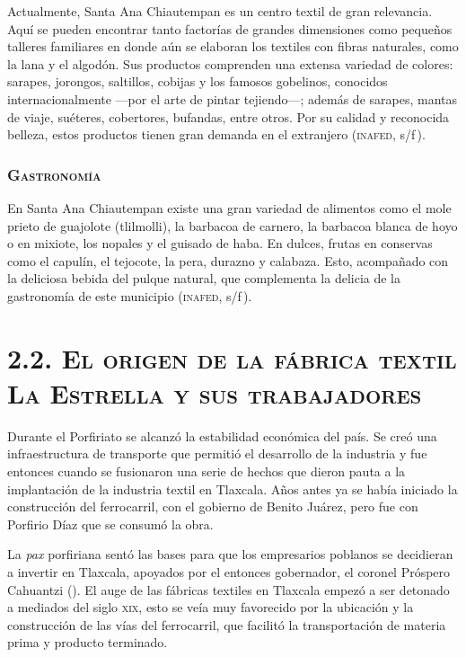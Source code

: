 \documentclass[14pt,letterpaper,twoside]{extbook} %
\begin{document}
\noindent Actualmente, Santa Ana Chiautempan es un centro textil de gran relevancia. Aquí se pueden encontrar tanto factorías de grandes dimensiones como pequeños talleres familiares en donde aún se elaboran los textiles con fibras naturales, como la lana y el algodón. Sus productos comprenden una extensa variedad de colores: sarapes, jorongos, saltillos, cobijas y los famosos gobelinos, conocidos internacionalmente ---por el arte de pintar tejiendo---; además de sarapes, mantas de viaje, suéteres, cobertores, bufandas, entre otros. Por su calidad y reconocida belleza, estos productos tienen gran demanda en el extranjero (\textsc{inafed}, s/f\,).

\subsubsection{\mdseries\large\textsc{Gastronomía}}

\noindent En Santa Ana Chiautempan existe una gran variedad de alimentos como el mole prieto de guajolote (tlilmolli), la barbacoa de carnero, la barbacoa blanca de hoyo o en mixiote, los nopales y el guisado de haba. En dulces, frutas en conservas como el capulín, el tejocote, la
pera, durazno y calabaza. Esto, acompañado con la deliciosa bebida del pulque natural, que complementa la delicia de la gastronomía de este municipio (\textsc{inafed}, s/f\,).

\section*{\mdseries\large\textsc{2.2. El origen de la fábrica textil La Estrella y sus trabajadores}}

\noindent Durante el Porfiriato se alcanzó la estabilidad económica del país. Se creó una infraestructura de transporte que permitió el desarrollo de la industria y fue entonces cuando se fusionaron una serie de hechos que dieron pauta a la implantación de la industria textil en Tlaxcala. Años antes ya se había iniciado la construcción del ferrocarril, con el gobierno de Benito Juárez, pero fue con Porfirio Díaz que se consumó la obra.

La \textit{pax} porfiriana sentó las bases para que los empresarios poblanos se decidieran a invertir en Tlaxcala, apoyados por el entonces gobernador, el coronel Próspero Cahuantzi (). El auge de las fábricas textiles en Tlaxcala empezó a ser detonado a mediados del siglo \textsc{xix}, esto se veía muy favorecido por la ubicación y la construcción de las vías del ferrocarril, que facilitó la transportación de materia prima y producto terminado.
\end{document}
